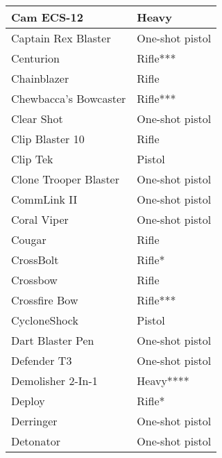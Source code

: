 \documentclass{scrbook}
\begin{document}
\begin{table}
\begin{tabular}{|l|l|}
 \hline Cam ECS-12 & Heavy \\
 \hline Captain Rex Blaster & One-shot pistol \\
 \hline Centurion & Rifle*** \\
 \hline Chainblazer & Rifle \\
 \hline Chewbacca's Bowcaster & Rifle*** \\
 \hline Clear Shot & One-shot pistol \\
 \hline Clip Blaster 10 & Rifle \\
 \hline Clip Tek & Pistol \\
 \hline Clone Trooper Blaster & One-shot pistol \\
 \hline CommLink II & One-shot pistol \\
 \hline Coral Viper & One-shot pistol \\
 \hline Cougar & Rifle \\
 \hline CrossBolt & Rifle* \\
 \hline Crossbow & Rifle \\
 \hline Crossfire Bow & Rifle*** \\
 \hline CycloneShock & Pistol \\
 \hline Dart Blaster Pen & One-shot pistol \\
 \hline Defender T3 & One-shot pistol \\
 \hline Demolisher 2-In-1 & Heavy**** \\
 \hline Deploy & Rifle* \\
 \hline Derringer & One-shot pistol \\
 \hline Detonator & One-shot pistol \\
 \hline \end{tabular}

\end{table}
\end{document}
